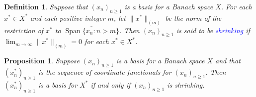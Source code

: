 \documentclass[11pt]{article}
\theoremstyle{thmstyle}
\newtheorem{proposition}[theorem]{Proposition}
\theoremstyle{defstyle}
\newtheorem{definition}[theorem]{Definition}
\newcommand{\Span}{\operatorname{Span}}
\newcommand{\define}[1]{\textcolor{blue}{\textit{#1}}}
\renewcommand{\ge}{\geqslant}
\begin{document}
\begin{definition}
	Suppose that $(x_n)_{n\ge 1}$ is a basis for a Banach space $X$. For each $x^\ast\in X^\ast$ and each positive integer $m$, let $\|x^\ast\|_{(m)}$ be the norm of the restriction of $x^\ast$ to $\overline{\Span\{x_n\colon n > m\}}$. Then $(x_n)_{n\ge1}$ is said to be \define{shrinking} if $\displaystyle\lim_{m\to\infty} \|x^\ast\|_{(m)} = 0$ for each $x^\ast\in X^\ast$.
\end{definition}

\begin{proposition}
	Suppose $(x_n)_{n\ge 1}$ is a basis for a Banach space $X$ and that $(x_n^\ast)_{n\ge 1}$ is the sequence of coordinate functionals for $(x_n)_{n\ge 1}$. Then $(x_n^\ast)_{n\ge 1}$ is a basis for $X^\ast$ if and only if $(x_n)_{n\ge 1}$ is shrinking.
\end{proposition}
\end{document}
